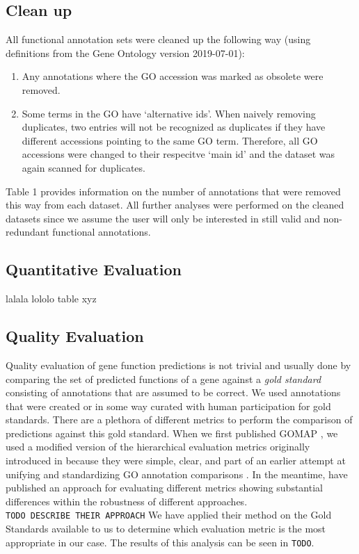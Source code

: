 \documentclass[utf8]{frontiersSCNS}
\providecommand{\tightlist}{%
  \setlength{\itemsep}{0pt}\setlength{\parskip}{0pt}}
\begin{document}
\hypertarget{clean-up}{%
\subsection{Clean up}\label{clean-up}}

All functional annotation sets were cleaned up the following way (using definitions from the Gene Ontology version 2019-07-01):

\begin{enumerate}
\def\labelenumi{\arabic{enumi}.}
\tightlist
\item
  Any annotations where the GO accession was marked as obsolete were removed.
\item
  Some terms in the GO have `alternative ids'. When naively removing duplicates, two entries will not be recognized as duplicates if they have different accessions pointing to the same GO term. Therefore, all GO accessions were changed to their respecitve `main id' and the dataset was again scanned for duplicates.
\end{enumerate}

Table 1 provides information on the number of annotations that were removed this way from each dataset.
All further analyses were performed on the cleaned datasets since we assume the user will only be interested in still valid and non-redundant functional annotations.

\hypertarget{quantitative-evaluation}{%
\subsection{Quantitative Evaluation}\label{quantitative-evaluation}}

lalala lololo table xyz

\hypertarget{quality-evaluation}{%
\subsection{Quality Evaluation}\label{quality-evaluation}}

Quality evaluation of gene function predictions is not trivial and usually done by comparing the set of predicted functions of a gene against a \emph{gold standard} consisting of annotations that are assumed to be correct.
We used annotations that were created or in some way curated with human participation for gold standards.
There are a plethora of different metrics to perform the comparison of predictions against this gold standard.
When we first published GOMAP \citep{Wimalanathan2018}, we used a modified version of the hierarchical evaluation metrics originally introduced in \citep{Verspoor2006} because they were simple, clear, and part of an earlier attempt at unifying and standardizing GO annotation comparisons \citep{Defoin-Platel2011}.
In the meantime, \citet{Plyusnin2018} have published an approach for evaluating different metrics showing substantial differences within the robustness of different approaches.
\texttt{TODO\ DESCRIBE\ THEIR\ APPROACH}
We have applied their method on the Gold Standards available to us to determine which evaluation metric is the most appropriate in our case.
The results of this analysis can be seen in \texttt{TODO}.
\end{document}
